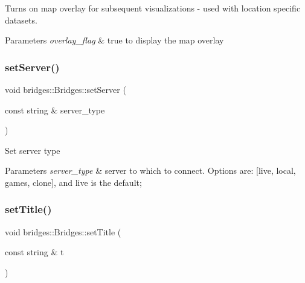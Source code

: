 Turns on map overlay for subsequent visualizations -\/ used with location specific datasets. 


\begin{DoxyParams}{Parameters}
{\em overlay\+\_\+flag} & true to display the map overlay \\
\hline
\end{DoxyParams}
\mbox{\label{classbridges_1_1_bridges_afa05302cf91c91b902aef693525107a5}} 
\subsubsection{\texorpdfstring{set\+Server()}{setServer()}}
{\footnotesize\ttfamily void bridges\+::\+Bridges\+::set\+Server (\begin{DoxyParamCaption}\item[{const string \&}]{server\+\_\+type }\end{DoxyParamCaption})\hspace{0.3cm}{\ttfamily [inline]}}

Set server type


\begin{DoxyParams}{Parameters}
{\em server\+\_\+type} & server to which to connect. Options are\+: \mbox{[}\textquotesingle{}live\textquotesingle{}, \textquotesingle{}local\textquotesingle{}, \textquotesingle{}games\textquotesingle{}, \textquotesingle{}clone\textquotesingle{}\mbox{]}, and \textquotesingle{}live\textquotesingle{} is the default; \\
\hline
\end{DoxyParams}
\mbox{\label{classbridges_1_1_bridges_ac9f2e0b5fd5c70053db233dcbb636b56}} 
\subsubsection{\texorpdfstring{set\+Title()}{setTitle()}}
{\footnotesize\ttfamily void bridges\+::\+Bridges\+::set\+Title (\begin{DoxyParamCaption}\item[{const string \&}]{t }\end{DoxyParamCaption})\hspace{0.3cm}{\ttfamily [inline]}}


